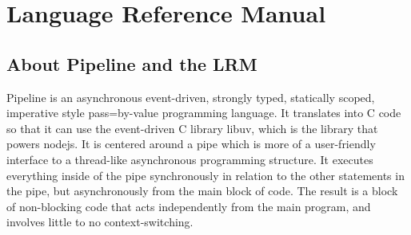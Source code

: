 \documentclass[./LRM_main.tex]{subfiles}
\begin{document}


\chapter{Language Reference Manual}
\section{About Pipeline and the LRM}
Pipeline is an asynchronous event-driven, strongly typed, statically scoped, imperative style pass=by-value programming language. It translates into C code so that it can use the event-driven C library libuv, which is the library that powers nodejs. It is centered around a pipe which is more of a user-friendly interface to a thread-like asynchronous programming structure. It executes everything inside of the pipe synchronously in relation to the other statements in the pipe, but asynchronously from the main block of code. The result is a block of non-blocking code that acts independently from the main program, and involves little to no context-switching.
\end{document}
